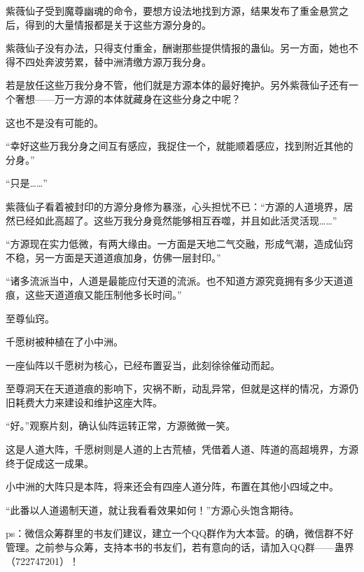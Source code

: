 \begin{this_body}
紫薇仙子受到魔尊幽魂的命令，要想方设法地找到方源，结果发布了重金悬赏之后，得到的大量情报都是关于这些方源分身的。

紫薇仙子没有办法，只得支付重金，酬谢那些提供情报的蛊仙。另一方面，她也不得不四处奔波劳累，替中洲清缴方源万我分身。

若是放任这些万我分身不管，他们就是方源本体的最好掩护。另外紫薇仙子还有一个奢想——万一方源的本体就藏身在这些分身之中呢？

这也不是没有可能的。

“幸好这些万我分身之间互有感应，我捉住一个，就能顺着感应，找到附近其他的分身。”

“只是……”

紫薇仙子看着被封印的方源分身修为暴涨，心头担忧不已：“方源的人道境界，居然已经如此高超了。这些万我分身竟然能够相互吞噬，并且如此活灵活现……”

“方源现在实力低微，有两大缘由。一方面是天地二气交融，形成气潮，造成仙窍不稳，另一方面是天道道痕加身，仿佛一层封印。”

“诸多流派当中，人道是最能应付天道的流派。也不知道方源究竟拥有多少天道道痕，这些天道道痕又能压制他多长时间。”

至尊仙窍。

千愿树被种植在了小中洲。

一座仙阵以千愿树为核心，已经布置妥当，此刻徐徐催动而起。

至尊洞天在天道道痕的影响下，灾祸不断，动乱异常，但就是这样的情况，方源仍旧耗费大力来建设和维护这座大阵。

“好。”观察片刻，确认仙阵运转正常，方源微微一笑。

这是人道大阵，千愿树则是人道的上古荒植，凭借着人道、阵道的高超境界，方源终于促成这一成果。

小中洲的大阵只是本阵，将来还会有四座人道分阵，布置在其他小四域之中。

“此番以人道遏制天道，就让我看看效果如何！”方源心头饱含期待。

ps：微信众筹群里的书友们建议，建立一个QQ群作为大本营。的确，微信群不好管理。之前参与众筹，支持本书的书友们，若有意向的话，请加入QQ群——蛊界（722747201）！

\end{this_body}

